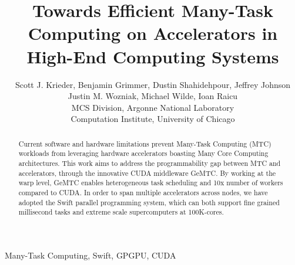 \documentclass[conference]{IEEEtran}
\begin{document}
%
\title{Towards Efficient Many-Task Computing on Accelerators in High-End Computing Systems}


\author{Scott J. Krieder,
Benjamin Grimmer,
Dustin Shahidehpour,
Jeffrey Johnson\\
Justin M. Wozniak,
Michael Wilde,
Ioan Raicu\\
MCS Division, Argonne National Laboratory\\
Computation Institute, University of Chicago
}


\maketitle


\begin{abstract}
Current software and hardware limitations prevent Many-Task Computing (MTC) workloads from leveraging hardware accelerators boasting Many Core Computing architectures. This work aims to address the programmability gap between MTC and accelerators, through the innovative CUDA middleware GeMTC. By working at the warp level, GeMTC enables heterogeneous task scheduling and 10x number of workers compared to CUDA. In order to span multiple accelerators across nodes, we have adopted the Swift parallel programming system, which can both support fine grained millisecond tasks and extreme scale supercomputers at 100K-cores.
\end{abstract}

\begin{IEEEkeywords}
Many-Task Computing, Swift, GPGPU, CUDA
\end{IEEEkeywords}

\IEEEpeerreviewmaketitle
\end{document}

